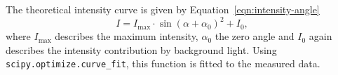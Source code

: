 The theoretical intensity curve is given by Equation~\ref{eqn:intensity-angle}
\begin{equation}
 I = I_{\text{max}} \cdot \sin{(\alpha + \alpha_{0})^{2}} + I_{0},
 \label{eqn:intensity-angle}
\end{equation}
where $I_{\text{max}}$ describes the maximum intensity, $\alpha_{0}$ the zero angle and $I_{0}$ again describes the intensity
contribution by background light. Using \texttt{scipy.optimize.curve\_fit}, this function is fitted to the measured data.
